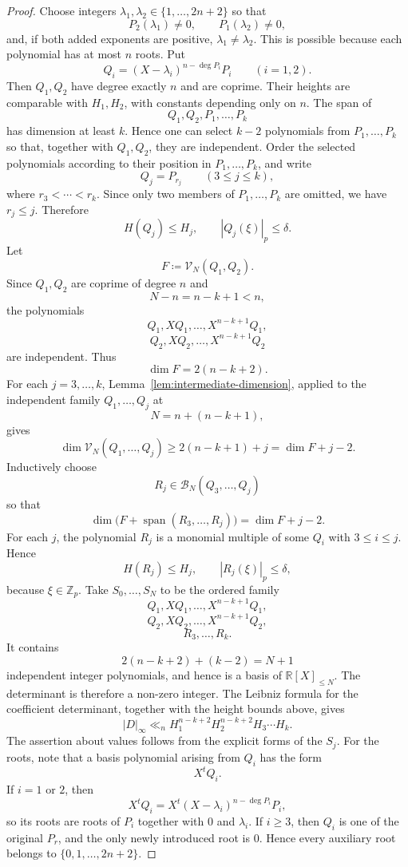 \documentclass[12pt,reqno]{amsart}
\theoremstyle{definition}
\theoremstyle{remark}
\newcommand{\R}{\mathbb R}
\newcommand{\Zp}{\mathbb Z_p}
\newcommand{\calB}{\mathcal B}
\newcommand{\calV}{\mathcal V}
\newcommand{\Span}{\operatorname{span}}
\begin{document}
\begin{proof}
Choose integers $\lambda_1,\lambda_2\in\{1,\ldots,2n+2\}$
so that
$$
P_2(\lambda_1)\neq0,
\qquad P_1(\lambda_2)\neq0,
$$
and, if both added exponents are positive, $\lambda_1\neq\lambda_2$. This is possible because each polynomial has at most $n$ roots. Put
$$
Q_i=(X-\lambda_i)^{n-\deg P_i}P_i
\qquad (i=1,2).
$$
Then $Q_1,Q_2$ have degree exactly $n$ and are coprime. Their heights are comparable with $H_1,H_2$, with constants depending only on $n$. The span of
$$
Q_1,Q_2,P_1,\ldots,P_k
$$
has dimension at least $k$. Hence one can select $k-2$ polynomials from
$P_1,\ldots,P_k$ so that, together with $Q_1,Q_2$, they are independent.
Order the selected polynomials according to their position in
$P_1,\ldots,P_k$, and write
$$
Q_j=P_{r_j}\qquad (3\leq j\leq k),
$$
where $r_3<\cdots<r_k$. Since only two members of $P_1,\ldots,P_k$ are
omitted, we have $r_j\leq j$. Therefore
$$
H(Q_j)\leq H_j,
\qquad |Q_j(\xi)|_p\leq\delta.
$$
Let
$$
F\coloneqq\calV_N(Q_1,Q_2).
$$
Since $Q_1,Q_2$ are coprime of degree $n$ and
$$
N-n=n-k+1<n,
$$
the polynomials
$$
Q_1,XQ_1,\ldots,X^{n-k+1}Q_1,
$$
$$
Q_2,XQ_2,\ldots,X^{n-k+1}Q_2
$$
are independent. Thus
$$
\dim F=2(n-k+2).
$$
For each $j=3,\ldots,k$, Lemma~\ref{lem:intermediate-dimension}, applied to the independent family $Q_1,\ldots,Q_j$ at
$$
N=n+(n-k+1),
$$
gives
$$
\dim\calV_N(Q_1,\ldots,Q_j)
\geq2(n-k+1)+j
=\dim F+j-2.
$$
Inductively choose
$$
R_j\in\calB_N(Q_3,\ldots,Q_j)
$$
so that
$$
\dim\bigl(F+\Span(R_3,\ldots,R_j)\bigr)
=\dim F+j-2.
$$
For each $j$, the polynomial $R_j$ is a monomial multiple of some $Q_i$ with $3\leq i\leq j$. Hence
$$
H(R_j)\leq H_j,
\qquad |R_j(\xi)|_p\leq\delta,
$$
because $\xi\in\Zp$. Take  $S_0,\ldots,S_N$ to be the ordered family
$$
Q_1,XQ_1,\ldots,X^{n-k+1}Q_1,
$$
$$
Q_2,XQ_2,\ldots,X^{n-k+1}Q_2,
$$
$$
R_3,\ldots,R_k.
$$
It contains
$$
2(n-k+2)+(k-2)=N+1
$$
independent integer polynomials, and hence is a basis of $\R[X]_{\leq N}$. The determinant is therefore a non-zero integer. The Leibniz formula for the coefficient determinant, together with the height bounds above, gives
$$
|D|_\infty
\ll_n
H_1^{n-k+2}H_2^{n-k+2}H_3\cdots H_k.
$$
The assertion about values follows from the explicit forms of the $S_j$. For the roots, note that a basis polynomial arising from $Q_i$ has the form
$$
X^tQ_i.
$$
If $i=1$ or $2$, then
$$
X^tQ_i
=
X^t(X-\lambda_i)^{n-\deg P_i}P_i,
$$
so its roots are roots of $P_i$ together with $0$ and $\lambda_i$. If
$i\geq3$, then $Q_i$ is one of the original $P_r$, and the only newly
introduced root is $0$. Hence every auxiliary root belongs to
$\{0,1,\ldots,2n+2\}$.
\end{proof}
\end{document}
